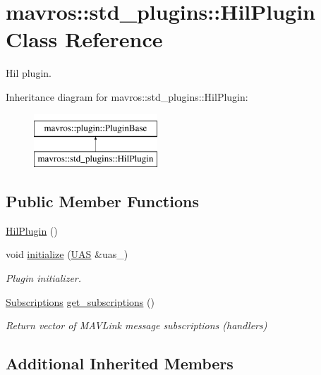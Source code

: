 \hypertarget{classmavros_1_1std__plugins_1_1HilPlugin}{}\section{mavros\+::std\+\_\+plugins\+::Hil\+Plugin Class Reference}
\label{classmavros_1_1std__plugins_1_1HilPlugin}


Hil plugin.  


Inheritance diagram for mavros\+::std\+\_\+plugins\+::Hil\+Plugin\+:\begin{figure}[H]
\begin{center}
\leavevmode
\includegraphics[height=2.000000cm]{classmavros_1_1std__plugins_1_1HilPlugin}
\end{center}
\end{figure}
\subsection*{Public Member Functions}
\begin{DoxyCompactItemize}
\item 
\mbox{\hyperlink{group__plugin_ga1c478bd6c8e29b4739d1687f1f4645aa}{Hil\+Plugin}} ()
\item 
void \mbox{\hyperlink{group__plugin_ga1c3a000c7280d16696fcb006961ae7d2}{initialize}} (\mbox{\hyperlink{classmavros_1_1UAS}{U\+AS}} \&uas\+\_\+)
\begin{DoxyCompactList}\small\item\em Plugin initializer. \end{DoxyCompactList}\item 
\mbox{\hyperlink{group__plugin_ga8967d61fc77040e0c3ea5a4585d62a09}{Subscriptions}} \mbox{\hyperlink{group__plugin_ga393b7527b376fb0e4706ac4f3d9298a3}{get\+\_\+subscriptions}} ()
\begin{DoxyCompactList}\small\item\em Return vector of M\+A\+V\+Link message subscriptions (handlers) \end{DoxyCompactList}\end{DoxyCompactItemize}
\subsection*{Additional Inherited Members}


